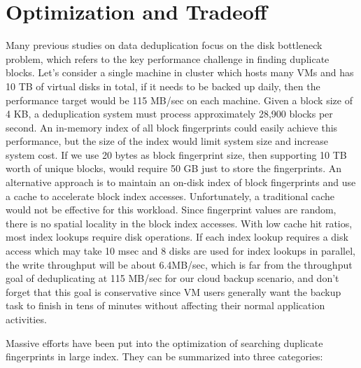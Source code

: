 \section{Optimization and Tradeoff}
\label{back:optm}
Many previous studies on data deduplication focus on the disk bottleneck problem,
which refers to the key performance challenge in finding duplicate blocks. 
Let's consider a single machine in cluster which hosts many VMs and has 10 TB of virtual disks in total,
if it needs to be backed up daily, then the performance target would be 115 MB/sec on each machine.
Given a block size of 4 KB, a deduplication system must process approximately 28,900 blocks per second.
An in-memory index of all block fingerprints could easily achieve this performance, but the size of the index would limit system size and increase system cost. 
If we use 20 bytes as block fingerprint size, then supporting 10 TB worth of unique blocks, would require 50 GB just to store the fingerprints.
An alternative approach is to maintain an on-disk index of block fingerprints and use a cache to accelerate block index accesses. Unfortunately, a traditional cache would not be effective for this workload. Since fingerprint values are random, there is no spatial locality in the block index accesses. 
With low cache hit ratios, most index lookups require disk operations. If each index lookup requires a disk access which may take 10 msec and 8 disks are used for index lookups in parallel, the write throughput will be about 6.4MB/sec, which is far from the throughput goal of deduplicating at 115 MB/sec for our cloud backup scenario, and don't forget that this goal
is conservative since VM users generally want the backup task to finish in tens of minutes without affecting their normal
application activities.

Massive efforts have been put into the optimization of searching duplicate
fingerprints in large index. They can be summarized into three categories:

